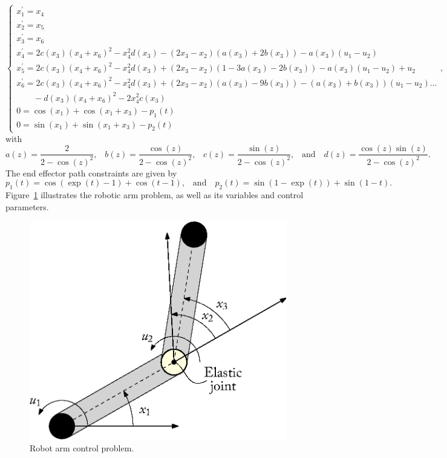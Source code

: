 \begin{equation}
  \begin{cases}
    x_1^{\prime} = x_4 \\
    x_2^{\prime} = x_5 \\
    x_3^{\prime} = x_6 \\
    x_4^{\prime} = 2c(x_3)(x_4+x_6)^2 - x_4^2d(x_3) - (2x_3-x_2)(a(x_3)+2b(x_3)) - a(x_3)(u_1-u_2) \\
    x_5^{\prime} = 2c(x_3)(x_4+x_6)^2 - x_4^2d(x_3) + (2 x_3-x_2)(1-3a(x_3)-2b(x_3)) - a(x_3)(u_1-u_2) + u_2 \\
    x_6^{\prime} = 2c(x_3)(x_4+x_6)^2 - x_4^2d(x_3) + (2 x_3-x_2)(a(x_3)-9b(x_3)) - (a(x_3)+b(x_3))(u_1-u_2) \dots \\
    \qquad - d(x_3)(x_4+x_6)^2 - 2x_4^2c(x_3) \\
    0 = \cos(x_1) + \cos(x_1+x_3) - p_1(t) \\
    0 = \sin(x_1) + \sin(x_1+x_3) - p_2(t)
  \end{cases} \text{,}
\end{equation}
%
with
%
\begin{equation}
  a(z) = \dfrac{2}{2-\cos(z)^2} \text{,}
  \quad
  b(z) = \dfrac{\cos(z)}{2-\cos(z)^2} \text{,}
  \quad
  c(z) = \dfrac{\sin(z)}{2-\cos(z)^2} \text{,}
  \quad \text{and} \quad
  d(z) = \dfrac{\cos(z)\sin(z)}{2-\cos(z)^2} \text{.}
\end{equation}
%
The end effector path constraints are given by
%
\begin{equation}
  p_1(t) = \cos(\exp(t) - 1) + \cos(t - 1) \text{,}
  \quad \text{and} \quad
  p_2(t) = \sin(1 - \exp(t)) + \sin(1 - t) \text{.}
\end{equation}
%
Figure~\ref{chap4:fig:robotic_arm} illustrates the robotic arm problem, as well as its variables and control parameters.

\begin{figure}[htb]
  \centering
  \includegraphics[width=0.4\linewidth]{figures/chapter_4/robotic_arm.eps}
  \caption{Robot arm control problem.}
  \label{chap4:fig:robotic_arm}
\end{figure}

